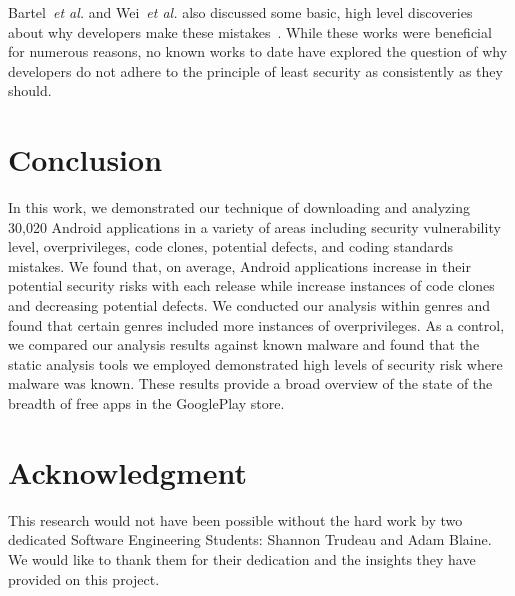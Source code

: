 \documentclass[conference]{IEEEtran}
\begin{document}
Bartel~\emph{et al.} and Wei~\emph{et al.} also discussed some basic, high level discoveries about why developers make these mistakes~\cite{Bartel:2012:ASP:2351676.2351722,Wei:2012:PEA:2420950.2420956}. While these works were beneficial for numerous reasons, no known works to date have explored the question of why developers do not adhere to the principle of least security as consistently as they should.

\section{Conclusion}
\label{sec: conclusion}

In this work, we demonstrated our technique of downloading and analyzing 30,020 Android applications in a variety of areas including security vulnerability level, overprivileges, code clones, potential defects, and coding standards mistakes. We found that, on average, Android applications increase in their potential security risks with each release while increase instances of code clones and decreasing potential defects. We conducted our analysis within genres and found that certain genres included more instances of overprivileges. As a control, we compared our analysis results against known malware and found that the static analysis tools we employed demonstrated high levels of security risk where malware was known. These results provide a broad overview of the state of the breadth of free apps in the GooglePlay store.

\section*{Acknowledgment}

This research would not have been possible without the hard work by two dedicated Software Engineering Students: Shannon Trudeau and Adam Blaine. We would like to thank them for their dedication and the insights they have provided on this project.

%



\balance
\end{document}
